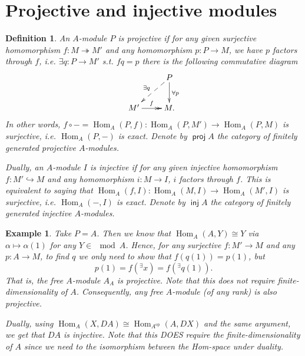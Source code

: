 \documentclass[11pt,a4paper]{article}
\numberwithin{equation}{section}
\theoremstyle{all}
\newtheorem{example}[theorem]{Example}
\newtheorem{definition}[theorem]{Definition}
\theoremstyle{remark}
\newcommand{\Hom}{\operatorname{Hom}\nolimits}
\newcommand{\op}{\mathrm{op}}
\DeclareMathOperator{\proj}{\mathsf{proj}}
\DeclareMathOperator{\inj}{\mathsf{inj}}
\newcommand{\defn}[1]{\textsl{\color{darkblue} #1}}
\begin{document}
\pagebreak

\section{Projective and injective modules}



\begin{definition}
An $A$-module $P$ is \defn{projective} if for any given surjective homomorphism $f:M\twoheadrightarrow M'$ and any homomorphism $p:P\rightarrow M$, we have $p$ factors through $f$, i.e. $\exists q:P\rightarrow M'$ s.t. $fq=p$ there is the following commutative diagram
\[
\xymatrix{ & P\ar@{-->}[ld]_{\exists q} \ar[d]^{\forall p}  \\
M' \ar@{->>}[r]^{f} & M.
}
\]
In other words, $f\circ- =\Hom_A(P,f):\Hom_A(P,M')\to \Hom_A(P,M)$ is surjective, i.e. $\Hom_A(P,-)$ is exact.
Denote by $\proj A$ the category of finitely generated projective $A$-modules.

Dually, an $A$-module $I$ is \defn{injective} if for any given injective homomorphism $f:M'\hookrightarrow M$ and any homomorphism $i:M\to I$, $i$ factors through $f$.  This is equivalent to saying that $\Hom_A(f,I):\Hom_A(M,I)\to\Hom_A(M',I)$ is surjective, i.e. $\Hom_A(-,I)$ is exact.
Denote by $\inj A$ the category of finitely generated injective $A$-modules.
\end{definition}

\begin{example}
Take $P=A$.  Then we know that $\Hom_A(A,Y)\cong Y$ via $\alpha\mapsto \alpha(1)$ for any $Y\in \mod A$.  Hence, for any surjective $f:M'\to M$ and any $p:A\to M$, to find $q$ we only need to show that $f(q(1))=p(1)$, but
\[
p(1)=f({}^\exists x)=f({}^\exists q(1)).
\]
That is, the free $A$-module $A_A$ is projective.  Note that this does not require finite-dimensionality of $A$.
Consequently, any free $A$-module (of \emph{any} rank) is also projective.

Dually, using $\Hom_A(X,DA)\cong \Hom_{A^\op}(A,DX)$ and the same argument, we get that $DA$ is injective.  Note that this \emph{DOES} require the finite-dimensionality of $A$ since we need to the isomorphism between the Hom-space under duality.
\end{example}
\end{document}
